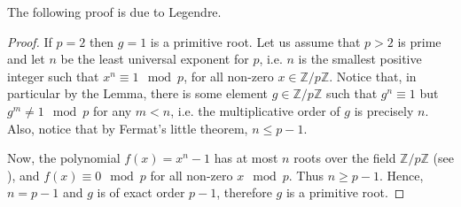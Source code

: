 \documentclass[12pt]{article}
\theoremstyle{definition}
\newcommand{\Ints}{\mathbb{Z}}
\begin{document}
The following proof is due to Legendre.

\begin{proof}
If $p=2$ then $g=1$ is a primitive root. Let us assume that $p>2$ is prime and let $n$ be the least universal exponent for $p$, i.e. $n$ is the smallest positive integer such that $x^n\equiv 1 \mod p$, for all non-zero $x\in \Ints/p\Ints$. Notice that, in particular by the Lemma, there is some element $g\in \Ints/p\Ints$ such that $g^n\equiv 1$ but $g^m\neq 1 \mod p$ for any $m<n$, i.e. the multiplicative order of $g$ is precisely $n$. Also, notice that by Fermat's little theorem, $n\leq p-1$.

Now, the polynomial $f(x)=x^n-1$ has at most $n$ roots over the field $\Ints/p\Ints$ (see ), and $f(x)\equiv 0 \mod p$ for all non-zero $x \mod p$. Thus $n\geq p-1$. Hence, $n=p-1$ and $g$ is of exact order $p-1$, therefore $g$ is a primitive root.
\end{proof}
\end{document}
